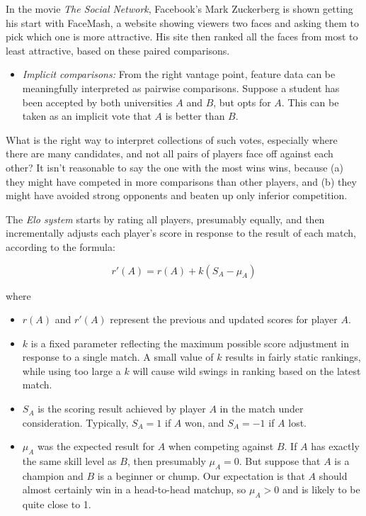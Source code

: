 \documentclass[10pt]{article}
\begin{document}
In the movie \textit{The Social Network}, Facebook’s Mark Zuckerberg is shown getting his start with FaceMash, a website showing viewers two faces and asking them to pick which one is more attractive. His site then ranked all the faces from most to least attractive, based on these paired comparisons.

\begin{itemize}
    \item \textit{Implicit comparisons:} From the right vantage point, feature data can be meaningfully interpreted as pairwise comparisons. Suppose a student has been accepted by both universities $A$ and $B$, but opts for $A$. This can be taken as an implicit vote that $A$ is better than $B$.
\end{itemize}

What is the right way to interpret collections of such votes, especially where there are many candidates, and not all pairs of players face off against each other? It isn’t reasonable to say the one with the most wins wins, because (a) they might have competed in more comparisons than other players, and (b) they might have avoided strong opponents and beaten up only inferior competition.

The \textit{Elo system} starts by rating all players, presumably equally, and then incrementally adjusts each player’s score in response to the result of each match, according to the formula:

\[
r'(A) = r(A) + k(S_{A} - \mu_{A})
\]

where

\begin{itemize}
    \item $r(A)$ and $r'(A)$ represent the previous and updated scores for player $A$.
    \item $k$ is a fixed parameter reflecting the maximum possible score adjustment in response to a single match. A small value of $k$ results in fairly static rankings, while using too large a $k$ will cause wild swings in ranking based on the latest match.
    \item $S_{A}$ is the scoring result achieved by player $A$ in the match under consideration. Typically, $S_{A} = 1$ if $A$ won, and $S_{A} = -1$ if $A$ lost.
    \item $\mu_{A}$ was the expected result for $A$ when competing against $B$. If $A$ has exactly the same skill level as $B$, then presumably $\mu_{A} = 0$. But suppose that $A$ is a champion and $B$ is a beginner or chump. Our expectation is that $A$ should almost certainly win in a head-to-head matchup, so $\mu_{A} > 0$ and is likely to be quite close to 1.
\end{itemize}
\end{document}
